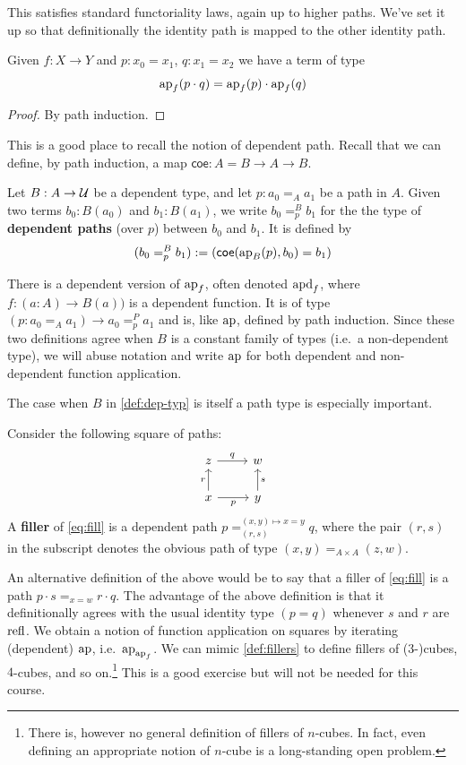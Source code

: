 \documentclass[10pt,oneside,leqno,openright]{memoir}
\begin{document}
This satisfies standard functoriality laws, again up to higher paths.
We've set it up so that definitionally the identity path is mapped to the other identity path.

\begin{lemma}
    Given $f : X \to Y$ and $p : x_0 = x_1$, $q : x_1 = x_2$ we have a term of type
    \[\operatorname{ap}_f(p \cdot q) = \operatorname{ap}_f(p) \cdot \operatorname{ap}_f(q)\]
\end{lemma}
\begin{proof}
    By path induction.
\end{proof}
%
This is a good place to recall the notion of dependent path.
%
Recall that we can define, by path induction, a map $\mathsf{coe} : A=B \to A \to B$.
%
\begin{definition}\label{def:dep-typ}
  Let $B : A \to \mathcal{U}$ be a dependent type, and let $p : a_0 =_A a_1$ be a path in $A$. Given two terms $b_0 : B(a_0)$ and $b_1:B(a_1)$, we write $b_0=^B_p b_1$ for the the type of \textbf{dependent paths} (over $p$) between $b_0$ and $b_1$. It is defined by
  \[(b_0=^B_p b_1) := (\mathsf{coe}(\operatorname{ap}_B(p), b_0) = b_1)\]
\end{definition}
%
\begin{remark}
  There is a dependent version of $\operatorname{ap}_f$, often denoted $\operatorname{apd}_f$, where $f : (a:A) \to B(a))$ is a dependent function. It is of type $(p : a_0=_A a_1) \to a_0=^P_p a_1$ and is, like $\operatorname{ap}$, defined by path induction. Since these two definitions agree when $B$ is a constant family of types (i.e.\ a non-dependent type), we will abuse notation and write $\operatorname{ap}$ for both dependent and non-dependent function application.  
\end{remark}
%
The case when $B$ in \cref{def:dep-typ} is itself a path type is especially important.
\begin{definition}\label{def:fillers}
Consider the following square of paths:
\begin{equation}\label{eq:fill}\begin{tikzcd}[ampersand replacement=\&]
	z \& w \\
	x \& y
	\arrow["q", from=1-1, to=1-2]
	\arrow["r", from=2-1, to=1-1]
	\arrow["p"', from=2-1, to=2-2]
	\arrow["s"', from=2-2, to=1-2]
\end{tikzcd}\end{equation}
A \textbf{filler} of \eqref{eq:fill} is a dependent path $p =_{(r,s)}^{(x,y)\mapsto x = y}q$, where the pair $(r,s)$ in the subscript denotes the obvious path of type $(x,y) =_{A \times A} (z,w)$.
\end{definition}
An alternative definition of the above would be to say that a filler of \eqref{eq:fill} is a path $p \cdot s =_{x = w} r \cdot q$. The advantage of the above definition is that it definitionally agrees with the usual identity type $(p= q)$ whenever $s$ and $r$ are $\mathrm{refl}$.
%
We obtain a notion of function application on squares by iterating (dependent) $\operatorname{ap}$, i.e.\ $\operatorname{ap}_{\operatorname{ap}_f}$.
%
We can mimic \cref{def:fillers} to define fillers of ($3$-)cubes, $4$-cubes, and so on.\footnote{There is, however no general definition of fillers of $n$-cubes. In fact, even defining an appropriate notion of $n$-cube is a long-standing open problem.} This is a good exercise but will not be needed for this course.
  
\end{document}
